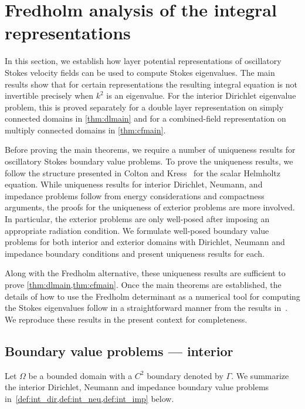 \section{Fredholm analysis of the integral representations}
\label{sec:analysis}
In this section, we establish how layer potential
representations of oscillatory Stokes velocity fields
can be used to compute Stokes eigenvalues.
%
The main results show that for certain representations
the resulting integral equation is not invertible precisely
when $k^2$ is an eigenvalue.
%
For the interior Dirichlet eigenvalue problem, this is
proved separately for a double layer representation on
simply connected domains in \cref{thm:dlmain} and
for a combined-field representation on multiply connected
domains in \cref{thm:cfmain}.
%

Before proving the main theorems, we require a number
of uniqueness results for oscillatory Stokes boundary
value problems.
%
To prove the uniqueness results, we follow the 
structure presented in Colton and Kress~\cite[Ch. 3]{colton1983integral}
for the scalar Helmholtz equation.
%
While uniqueness results for interior Dirichlet,
Neumann, and impedance problems follow from energy
considerations and compactness arguments, the proofs
for the uniqueness of exterior problems are more
involved.
%
In particular, the exterior problems are only 
well-posed after imposing an appropriate radiation
condition.
%
We formulate well-posed boundary value problems 
for both interior and exterior domains with
Dirichlet, Neumann and impedance boundary
conditions and present uniqueness results for
each.


Along with the Fredholm alternative, these uniqueness
results are sufficient to prove
\cref{thm:dlmain,thm:cfmain}.
%
Once the main theorems are established,
the details of how to use the Fredholm determinant
as a numerical tool for computing the Stokes eigenvalues
follow in a straightforward manner from the results
in~\cite{zhao2015robust}.
%
We reproduce these results in the present
context for completeness.

\subsection{Boundary value problems --- interior}

Let $\Omega$ be a bounded domain with a $C^2$ boundary
denoted by $\Gamma$.
We summarize the interior Dirichlet, Neumann and impedance
boundary value problems in~\cref{def:int_dir,def:int_neu,def:int_imp} below.

